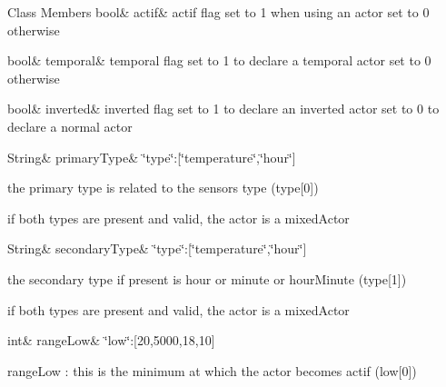 \begin{DoxyFields}{Class Members}
\mbox{\label{class_cool_board_actor_a7963178c2de01ef0d2861f9f59ad6f3c}} 
bool&
actif&
actif flag set to 1 when using an actor set to 0 otherwise \\
\hline

\mbox{\label{class_cool_board_actor_a6442a8c3a30abc48472f3e5284b786ea}} 
bool&
temporal&
temporal flag set to 1 to declare a temporal actor set to 0 otherwise \\
\hline

\mbox{\label{class_cool_board_actor_aa4fdca81973fd7b29541877db1cf27bd}} 
bool&
inverted&
inverted flag set to 1 to declare an inverted actor set to 0 to declare a normal actor \\
\hline

\mbox{\label{class_cool_board_actor_a8a0b318fd2814cf67fe74ee8164df55e}} 
String&
primaryType&
\char`\"{}type\char`\"{}\+:\mbox{[}\char`\"{}temperature\char`\"{},\char`\"{}hour\char`\"{}\mbox{]}

the primary type is related to the sensor\textquotesingle{}s type (type\mbox{[}0\mbox{]})

if both types are present and valid, the actor is a mixed\+Actor \\
\hline

\mbox{\label{class_cool_board_actor_a44e8f69868f2491b79ed075f84aa0fcb}} 
String&
secondaryType&
\char`\"{}type\char`\"{}\+:\mbox{[}\char`\"{}temperature\char`\"{},\char`\"{}hour\char`\"{}\mbox{]}

the secondary type if present is hour or minute or hour\+Minute (type\mbox{[}1\mbox{]})

if both types are present and valid, the actor is a mixed\+Actor \\
\hline

\mbox{\label{class_cool_board_actor_a43f891c9fb3bb63575c27cec860de55a}} 
int&
rangeLow&
\char`\"{}low\char`\"{}\+:\mbox{[}20,5000,18,10\mbox{]}

range\+Low \+: this is the minimum at which the actor becomes actif (low\mbox{[}0\mbox{]}) \\
\hline


\end{DoxyFields}
